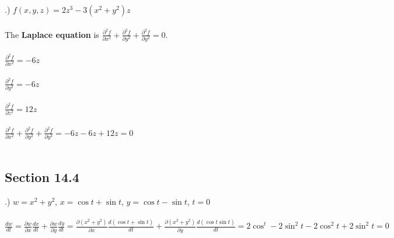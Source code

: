 \documentclass[12pt]{article}
\begin{document}
.) $f(x,y,z)=2z^{3}-3(x^{2}+y^{2})z$\\\\
\noindent The \textbf{Laplace equation} is $\frac{\partial ^{2}f}{\partial x^{2}} + \frac{\partial ^{2}f}{\partial y^{2}} + \frac{\partial^{2} f}{\partial y^{2}} = 0$.\\\\
\noindent $\frac{\partial ^{2}f}{\partial x^{2}} = -6z$\\\\
\noindent $\frac{\partial ^{2}f}{\partial y^{2}} = -6z$\\\\
\noindent $\frac{\partial ^{2}f}{\partial z^{2}} = 12z$\\\\
\noindent $\frac{\partial ^{2}f}{\partial x^{2}} + \frac{\partial ^{2}f}{\partial y^{2}} + \frac{\partial^{2} f}{\partial y^{2}} = 
-6z -6z + 12z = 0$\\\\ 


\subsection*{Section 14.4}
.) $w = x^{2} + y^{2}$, \hspace{10pt} $x = \cos{t} + \sin{t}$, \hspace{10pt} $y = \cos{t} - \sin{t}$, \hspace{10pt} $t=0$\\\\
\noindent $\frac{dw}{dt} = \frac{\partial w}{\partial x} \frac{dx}{dt} + \frac{\partial w}{\partial y}\frac{dy}{dt}
=\frac{\partial (x^{2} + y^{2})}{\partial x}\frac{d(\cos{t} + \sin{t})}{dt} + \frac{\partial (x^{2} + y^{2})}{\partial y}\frac{d(\cos{t}\sin{t})}{dt} = 2\cos^{t}-2\sin^{2}{t}-2\cos^{2}{t}+2\sin^{2}{t} = 0$\\\\
\end{document}

